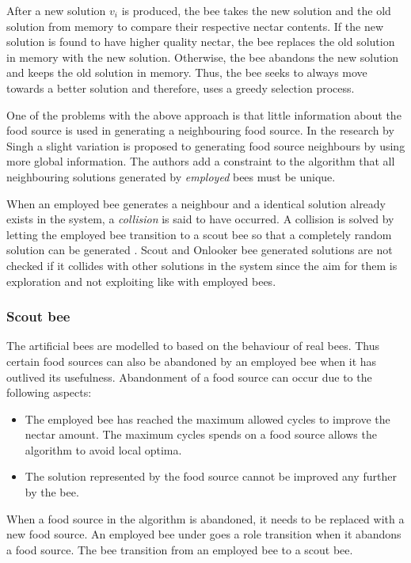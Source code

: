After a new solution $v_i$ is produced, the bee takes the new solution and the old solution from memory to compare their respective nectar contents. If the new solution is found to have higher quality nectar, the bee replaces the old solution in memory with the new solution. Otherwise, the bee abandons the new solution and keeps the old solution in memory. Thus, the bee seeks to always move towards a better solution and therefore, uses a greedy selection process.

One of the problems with the above approach is that little information about the food source is used in generating a neighbouring food source. In the research by Singh \cite{ABCLeafConstrained} a slight variation is proposed to generating food source neighbours by using more global information. The authors add a constraint to the algorithm that all neighbouring solutions generated by \emph{employed} bees must be unique. 

When an employed bee generates a neighbour and a identical solution already exists in the system, a \emph{collision} is said to have occurred. A collision is solved by letting the employed bee transition to a scout bee so that a completely random solution can be generated \cite{ABCLeafConstrained}. Scout and Onlooker bee generated solutions are not checked if it collides with other solutions in the system since the aim for them is exploration and not exploiting like with employed bees. 
\subsubsection{Scout bee}
The artificial bees are modelled to based on the behaviour of real bees. Thus certain food sources can also be abandoned by an employed bee when it has outlived its usefulness. Abandonment of a food source can occur due to the following aspects:
\begin{itemize}
\item The employed bee has reached the maximum allowed cycles to improve the nectar amount. The maximum cycles spends on a food source allows the algorithm to avoid local optima.
\item The solution represented by the food source cannot be improved any further by the bee.
\end{itemize}
When a food source in the algorithm is abandoned, it needs to be replaced with a new food source. An employed bee under goes a role transition when it abandons a food source. The bee transition from an employed bee to a scout bee. 


